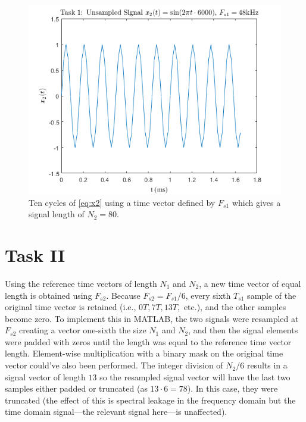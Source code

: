 \documentclass[a4paper,12pt]{article}
\begin{document}
\begin{figure}[!t]
    \centering
    \includegraphics[width=1\textwidth]{T1b.png}
    \captionsetup{justification=centering}
    \caption{\small Ten cycles of \cref{eq:x2} using a time vector defined by $F_{s1}$ which gives a signal length of $N_2 = 80$.}
    \label{T1b}
\end{figure}



\clearpage
\section*{Task II}
Using the reference time vectors of length $N_1$ and $N_2$, a new time vector of equal length is obtained using $F_{s2}$. Because $F_{s2} = F_{s1}/6$, every sixth $T_{s1}$ sample of the original time vector is retained (i.e., $0T, 7T, 13T,$ etc.), and the other samples become zero. To implement this in MATLAB, the two signals were resampled at $F_{s2}$ creating a vector one-sixth the size $N_1$ and $N_2$, and then the signal elements were padded with zeros until the length was equal to the reference time vector length. Element-wise multiplication with a binary mask on the original time vector could've also been performed. The integer division of $N_2 / 6$ results in a signal vector of length $13$ so the resampled signal vector will have the last two samples either padded or truncated (as $13 \cdot 6 = 78$). In this case, they were truncated (the effect of this is spectral leakage in the frequency domain but the time domain signal---the relevant signal here---is unaffected).
\end{document}
